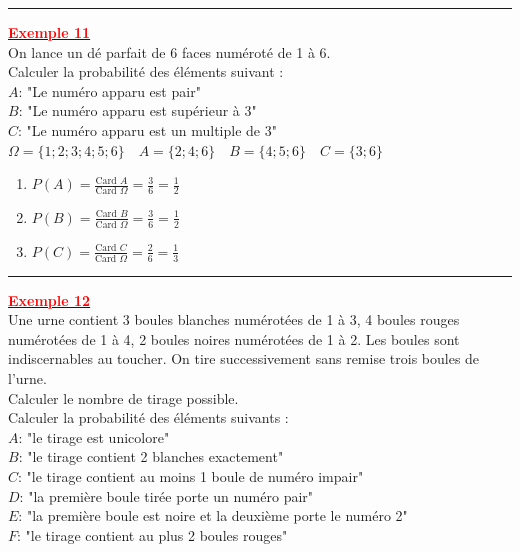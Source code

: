 \documentclass[12pt,a4paper]{article}
\begin{document}
\rule{\linewidth}{0.5pt}

\underline{\textbf{\textcolor{red}{Exemple 11}}}\\
On lance un dé parfait de 6 faces numéroté de 1 à 6. \\
Calculer la probabilité des éléments suivant : \\
$A$: "Le numéro apparu est pair" \\
$B$: "Le numéro apparu est supérieur à 3" \\
$C$: "Le numéro apparu est un multiple de 3" \\

$\Omega = \{1; 2; 3; 4; 5; 6\} \quad A = \{2; 4; 6\} \quad B = \{4; 5; 6\} \quad C = \{3; 6\}$

\begin{enumerate}
    \item $P(A) = \frac{\text{Card } A}{\text{Card } \Omega} = \frac{3}{6} = \frac{1}{2}$
    \item $P(B) = \frac{\text{Card } B}{\text{Card } \Omega} = \frac{3}{6} = \frac{1}{2}$
    \item $P(C) = \frac{\text{Card } C}{\text{Card } \Omega} = \frac{2}{6} = \frac{1}{3}$
\end{enumerate}

\rule{\linewidth}{0.5pt}

\underline{\textbf{\textcolor{red}{Exemple 12}}}\\
Une urne contient 3 boules blanches numérotées de 1 à 3, 4 boules rouges numérotées de 1 à 4, 2 boules noires numérotées de 1 à 2. Les boules sont indiscernables au toucher. On tire successivement sans remise trois boules de l'urne. \\
Calculer le nombre de tirage possible. \\
Calculer la probabilité des éléments suivants : \\
$A$: "le tirage est unicolore" \\
$B$: "le tirage contient 2 blanches exactement" \\
$C$: "le tirage contient au moins 1 boule de numéro impair" \\
$D$: "la première boule tirée porte un numéro pair" \\
$E$: "la première boule est noire et la deuxième porte le numéro 2" \\
$F$: "le tirage contient au plus 2 boules rouges"
\end{document}
